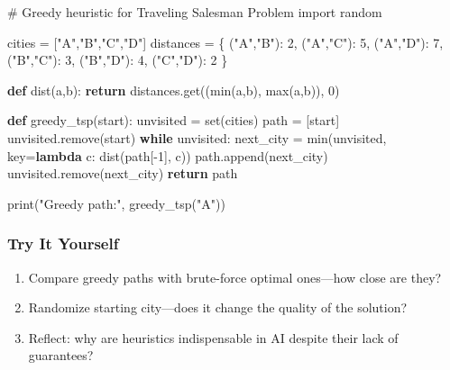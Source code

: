 \documentclass[
  letterpaper,
  DIV=11,
  numbers=noendperiod]{scrreprt}
\newenvironment{Shaded}{\begin{snugshade}}{\end{snugshade}}
\newcommand{\BuiltInTok}[1]{\textcolor[rgb]{0.00,0.23,0.31}{#1}}
\newcommand{\CommentTok}[1]{\textcolor[rgb]{0.37,0.37,0.37}{#1}}
\newcommand{\ControlFlowTok}[1]{\textcolor[rgb]{0.00,0.23,0.31}{\textbf{#1}}}
\newcommand{\DecValTok}[1]{\textcolor[rgb]{0.68,0.00,0.00}{#1}}
\newcommand{\ImportTok}[1]{\textcolor[rgb]{0.00,0.46,0.62}{#1}}
\newcommand{\KeywordTok}[1]{\textcolor[rgb]{0.00,0.23,0.31}{\textbf{#1}}}
\newcommand{\NormalTok}[1]{\textcolor[rgb]{0.00,0.23,0.31}{#1}}
\newcommand{\OperatorTok}[1]{\textcolor[rgb]{0.37,0.37,0.37}{#1}}
\newcommand{\StringTok}[1]{\textcolor[rgb]{0.13,0.47,0.30}{#1}}
\providecommand{\tightlist}{%
  \setlength{\itemsep}{0pt}\setlength{\parskip}{0pt}}
\begin{document}
\begin{Shaded}
\begin{Highlighting}[]
\CommentTok{\# Greedy heuristic for Traveling Salesman Problem}
\ImportTok{import}\NormalTok{ random}

\NormalTok{cities }\OperatorTok{=}\NormalTok{ [}\StringTok{"A"}\NormalTok{,}\StringTok{"B"}\NormalTok{,}\StringTok{"C"}\NormalTok{,}\StringTok{"D"}\NormalTok{]}
\NormalTok{distances }\OperatorTok{=}\NormalTok{ \{}
\NormalTok{    (}\StringTok{"A"}\NormalTok{,}\StringTok{"B"}\NormalTok{): }\DecValTok{2}\NormalTok{, (}\StringTok{"A"}\NormalTok{,}\StringTok{"C"}\NormalTok{): }\DecValTok{5}\NormalTok{, (}\StringTok{"A"}\NormalTok{,}\StringTok{"D"}\NormalTok{): }\DecValTok{7}\NormalTok{,}
\NormalTok{    (}\StringTok{"B"}\NormalTok{,}\StringTok{"C"}\NormalTok{): }\DecValTok{3}\NormalTok{, (}\StringTok{"B"}\NormalTok{,}\StringTok{"D"}\NormalTok{): }\DecValTok{4}\NormalTok{,}
\NormalTok{    (}\StringTok{"C"}\NormalTok{,}\StringTok{"D"}\NormalTok{): }\DecValTok{2}
\NormalTok{\}}

\KeywordTok{def}\NormalTok{ dist(a,b):}
    \ControlFlowTok{return}\NormalTok{ distances.get((}\BuiltInTok{min}\NormalTok{(a,b), }\BuiltInTok{max}\NormalTok{(a,b)), }\DecValTok{0}\NormalTok{)}

\KeywordTok{def}\NormalTok{ greedy\_tsp(start):}
\NormalTok{    unvisited }\OperatorTok{=} \BuiltInTok{set}\NormalTok{(cities)}
\NormalTok{    path }\OperatorTok{=}\NormalTok{ [start]}
\NormalTok{    unvisited.remove(start)}
    \ControlFlowTok{while}\NormalTok{ unvisited:}
\NormalTok{        next\_city }\OperatorTok{=} \BuiltInTok{min}\NormalTok{(unvisited, key}\OperatorTok{=}\KeywordTok{lambda}\NormalTok{ c: dist(path[}\OperatorTok{{-}}\DecValTok{1}\NormalTok{], c))}
\NormalTok{        path.append(next\_city)}
\NormalTok{        unvisited.remove(next\_city)}
    \ControlFlowTok{return}\NormalTok{ path}

\BuiltInTok{print}\NormalTok{(}\StringTok{"Greedy path:"}\NormalTok{, greedy\_tsp(}\StringTok{"A"}\NormalTok{))}
\end{Highlighting}
\end{Shaded}

\subsubsection{Try It Yourself}\label{try-it-yourself-35}

\begin{enumerate}
\def\labelenumi{\arabic{enumi}.}
\tightlist
\item
  Compare greedy paths with brute-force optimal ones---how close are
  they?
\item
  Randomize starting city---does it change the quality of the solution?
\item
  Reflect: why are heuristics indispensable in AI despite their lack of
  guarantees?
\end{enumerate}
\end{document}
